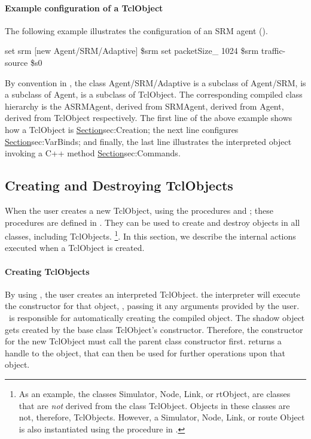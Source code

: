 \paragraph{Example configuration of a TclObject}
The following example illustrates the configuration of
an SRM agent ().
\begin{program}
        set srm [new Agent/SRM/Adaptive]
        \$srm set packetSize_ 1024
        \$srm traffic-source \$s0
\end{program}
By convention in \ns,
the class Agent/SRM/Adaptive is a subclass of Agent/SRM,
is a subclass of Agent, is a subclass of TclObject.
The corresponding compiled class hierarchy is
the ASRMAgent, derived from SRMAgent, derived from Agent,
derived from TclObject respectively.
The first line of the above example shows how a TclObject is 
\href{created (or destroyed)}{Section}{sec:Creation};
the next line configures
\href{a bound variable}{Section}{sec:VarBinds};
and finally, the last line illustrates
the interpreted object invoking a C++ method
\href{as if they were an instance procedure}{Section}{sec:Commands}.

\subsection{Creating and Destroying TclObjects}
\label{sec:Creation}

When the user creates a new TclObject,
using the procedures  and ;
these procedures are defined in .
They can be used to create and destroy objects in all classes,
including TclObjects.%
\footnote{As an example, the classes Simulator, Node, Link, or rtObject,
are classes that are \emph{not} derived from the class TclObject.
Objects in these classes  are not, therefore, TclObjects.
However, a Simulator, Node, Link, or route Object is also instantiated
using the  procedure in \ns.}.
In this section,
we describe the internal actions executed when a TclObject
is created.

\paragraph{Creating TclObjects}
By using , the user creates an interpreted TclObject.
the interpreter will execute the constructor for that object, ,
passing it any arguments provided by the user.
\ns\ is responsible for automatically  creating the compiled object.
The shadow object gets created by the base class TclObject's constructor.
Therefore, the constructor for the new TclObject
must call the parent class constructor first.
 returns a handle to the object, that can then be used
for further operations upon that object.

